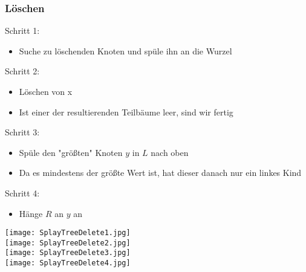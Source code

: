 		\subsubsection{Löschen}
			\begin{minipage}{0.5\textwidth}
				Schritt 1:
				\begin{itemize}
					\item Suche zu löschenden Knoten und spüle ihn an die Wurzel
				\end{itemize}

				\vspace{0.8cm}
				Schritt 2:
				\begin{itemize}
					\item Löschen von x
					\item Ist einer der resultierenden Teilbäume leer, sind wir fertig
				\end{itemize}

				\vspace{0.8cm}
				Schritt 3:
				\begin{itemize}
					\item Spüle den "grö\ss ten" Knoten $y$ in $L$ nach oben
					\item Da es mindestens der grö\ss te Wert ist, hat dieser danach 
						nur ein linkes Kind
				\end{itemize}

				\vspace{0.8cm}
				Schritt 4:
				\begin{itemize}
					\item Hänge $R$ an $y$ an
				\end{itemize}
			\end{minipage}
			\hspace{1cm}
			\begin{minipage}{0.45\textwidth}
				\begin{center}
					\texttt{[image: SplayTreeDelete1.jpg]} \\
					\vspace{2.4cm}
					\texttt{[image: SplayTreeDelete2.jpg]} \\
					\vspace{2.4cm}
					\texttt{[image: SplayTreeDelete3.jpg]} \\
					\vspace{0.8cm}
					\texttt{[image: SplayTreeDelete4.jpg]} \\
				\end{center}
			\end{minipage}
			


